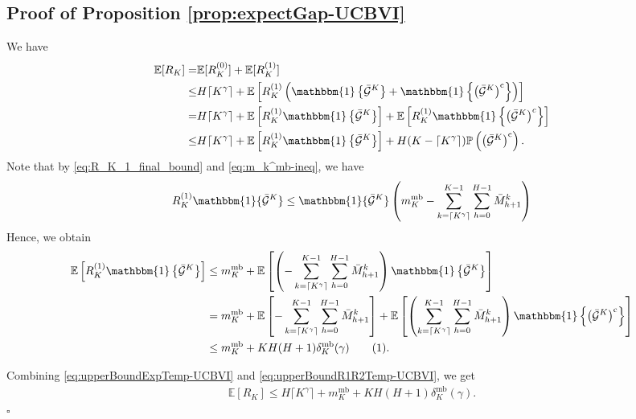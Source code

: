 \documentclass[11pt]{article}
\newcommand{\E} {\mathbb{E}}
\newcommand{\PP}{\mathbb{P}}
\newcommand{\Dvm}{\bar{M}}
\newcommand\numberthis{\addtocounter{equation}{1}\tag{\theequation}}
\begin{document}
\subsection{Proof of Proposition \ref{prop:expectGap-UCBVI}}
    We have
    \begin{align}
        \E[R_K] = & \E[R_K^{(0)}] + \E[R_K^{(1)}] \nonumber\\
        \leq &H\lceil K^\gamma\rceil + \E\left[R_K^{(1)}  \left(\mathbbm{1}\left\{\bar{\mathcal{G}}^K\right\} + \mathbbm{1}\left\{\left(\bar{\mathcal{G}}^K\right)^\mathrm{c}\right\}\right)\right] \nonumber\\
        = &H\lceil K^\gamma\rceil + \E \left[R_K^{(1)} \mathbbm{1}\left\{\bar{\mathcal{G}}^K\right\}\right] + \E\left[R_K^{(1)} \mathbbm{1}\left\{\left(\bar{\mathcal{G}}^K\right)^c\right\}\right] \nonumber\\
        \leq &H\lceil K^\gamma\rceil + \E \left[R_K^{(1)} \mathbbm{1}\left\{\bar{\mathcal{G}}^K\right\}\right] + H(K-\lceil K^\gamma\rceil)\PP\left(\left(\bar{\mathcal{G}}^K\right)^\mathrm{c}\right).\label{eq:upperBoundExpTemp-UCBVI}
    \end{align}
    Note that by \eqref{eq:R_K_1_final_bound} and \eqref{eq:m_k^mb-ineq}, we have
    \begin{align*}  
    R_K^{(1)} \mathbbm{1}\{\bar{\mathcal{G}}^K\} \leq   \mathbbm{1}\{\bar{\mathcal{G}}^K\}\left(m_K^{\mathrm{mb}} - \sum_{k=\lceil K^\gamma\rceil}^{K-1}\sum_{h=0}^{H-1} \Dvm_{h+1}^k \right)
    \end{align*}
    Hence, we obtain
    \begin{align*}
        \E \left[R_K^{(1)} \mathbbm{1}\left\{\bar{\mathcal{G}}^K\right\}\right] 
        &\leq m_K^{\mathrm{mb}} + \E\left[\left( - \sum_{k=\lceil K^\gamma\rceil}^{K-1}\sum_{h=0}^{H-1} \Dvm_{h+1}^k\right) \mathbbm{1}\left\{\bar{\mathcal{G}}^K\right\}\right]\\
        &=m_K^{\mathrm{mb}} + \E\left[ - \sum_{k=\lceil K^\gamma\rceil}^{K-1}\sum_{h=0}^{H-1} \Dvm_{h+1}^k\right] + \E\left[\left( \sum_{k=\lceil K^\gamma\rceil}^{K-1}\sum_{h=0}^{H-1} \Dvm_{h+1}^k\right) \mathbbm{1}\left\{\left(\bar{\mathcal{G}}^K\right)^{\mathrm{c}}\right\}\right]\\
        &\leq m_K^{\mathrm{mb}} + KH(H+1)\delta_K^{\mathrm{mb}}(\gamma)\numberthis\label{eq:upperBoundR1R2Temp-UCBVI}.
    \end{align*}

    Combining \eqref{eq:upperBoundExpTemp-UCBVI} and \eqref{eq:upperBoundR1R2Temp-UCBVI}, we get
    \begin{align*}
        \E[R_K]\leq  H\lceil K^\gamma\rceil + m_K^{\mathrm{mb}} + KH(H+1)\delta_K^{\mathrm{mb}}(\gamma).
\end{align*}\hfill$\square$
\end{document}

